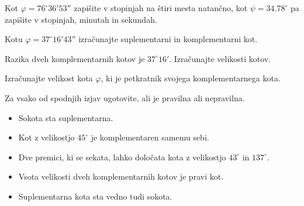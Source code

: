 \begin{multicols}{2}
\begin{naloga}
\begin{figure}[H]

        \end{figure}
    \end{naloga}


    \end{multicols}

        


    \begin{naloga}
        Kot $\varphi=76^\circ 36'53''$ zapišite v stopinjah na štiri mesta natančno, 
        kot $\psi=34.78^\circ$ pa zapišite v stopinjah, minutah in sekundah.
    \end{naloga}

    \begin{naloga}
        Kotu $\varphi=37^\circ 16'43''$ izračunajte suplementarni in komplementarni kot.
    \end{naloga}

    \begin{naloga}
        Razika dveh komplementarnih kotov je $37^\circ 16'$. Izračunajte velikosti kotov.
    \end{naloga}

    \begin{naloga}
        Izračunajte velikost kota $\varphi$, ki je petkratnik svojega komplementarnega kota.
    \end{naloga}





    \begin{naloga}
        Za vsako od spodnjih izjav ugotovite, ali je pravilna ali nepravilna.
        \begin{itemize}
            \item Sokota sta suplementarna.
            \item Kot z velikostjo $45^\circ$ je komplementaren samemu sebi.
            \item Dve premici, ki se sekata, lahko določata kota z velikostjo $43^\circ$ in $137^\circ$.
            \item Vsota velikosti dveh komplementarnih kotov je pravi kot.
            \item Suplementarna kota sta  vedno tudi sokota.
        \end{itemize}
    \end{naloga}

